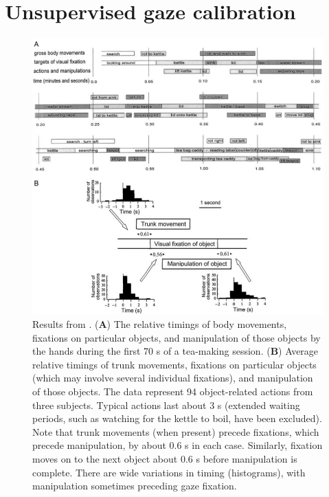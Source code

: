 \documentclass[11pt,a4paper]{article}
\begin{document}
\section{Unsupervised gaze calibration}
\begin{figure}[!ht]
\begin{center}
\includegraphics[scale=0.5]{Pictures/GazeObjectBehavior_Land.png}
\end{center}
\caption{Results from \cite{Land2009}. (\textbf{A}) The relative timings of body movements, fixations on particular objects, and manipulation of those objects by the hands during the first 70 s of a tea-making session.
(\textbf{B}) Average relative timings of trunk movements,
fixations on particular objects (which may involve several individual fixations), and manipulation of those objects. The data represent
94 object-related actions from three subjects. Typical actions last about 3 s (extended waiting periods, such as watching for the kettle to
boil, have been excluded). Note that trunk movements (when present) precede fixations, which precede manipulation, by about 0.6 s in
each case. Similarly, fixation moves on to the next object about 0.6 s before manipulation is complete. There are wide variations in timing
(histograms), with manipulation sometimes preceding gaze fixation.\label{LandResults}}
\end{figure}


\clearpage


\end{document}
